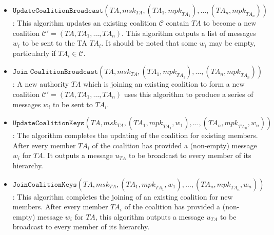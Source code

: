 \documentclass{llncs}
\newcommand{\TA}{\mathit{TA}}
\newcommand{\mpk}{\mathit{mpk}}
\newcommand{\msk}{\mathit{msk}}
\begin{document}
\begin{itemize}
%

\item $\texttt{UpdateCoalitionBroadcast}(\TA,\msk_{\TA},(\TA_{1},\mpk_{\TA_{1}}),\ldots,
(\TA_{n},\mpk_{\TA_{n}}))$: This algorithm updates an existing
coalition $\mathcal{C}$ contain $\TA$ to become a new coalition
$\mathcal{C}'=(\TA,\TA_{1},\ldots,\TA_{n})$. This algorithm outputs
a list of messages $w_{i}$ to be sent to the TA $\TA_{i}$. It should
be noted that some $w_{i}$ may be empty, particularly if $\TA_{i}\in
\mathcal{C}$.\medskip

\item $\texttt{Join CoalitionBroadcast}(\TA,\msk_{\TA},(\TA_{1},\mpk_{\TA_{1}}),\ldots,
(\TA_{n},\mpk_{\TA_{n}}))$: A new authority $\TA$ which is joining
an existing coalition to form a new coalition
$\mathcal{C}'=(\TA,\TA_{1},\ldots,\TA_{n})$ uses this algorithm to
produce a series of messages $w_{i}$ to be sent to
$\TA_{i}$.\medskip

\item $\texttt{UpdateCoalitionKeys}(\TA,\msk_{\TA},(\TA_{1},\mpk_{\TA_{1}},w_{1}),\ldots,
(\TA_{n},\mpk_{\TA_{n}},w_{n}))$: The algorithm completes the
updating of the coalition for existing members. After every member
$\TA_{i}$ of the coalition has provided a (non-empty) message
$w_{i}$ for $\TA$. It outputs a message $u_{\TA}$ to be broadcast to
every member of its hierarchy.\medskip

\item $\texttt{JoinCoalitionKeys}(\TA,\msk_{\TA},(\TA_{1},\mpk_{\TA_{1}},w_{1}),\ldots,
(\TA_{n},\mpk_{\TA_{n}},w_{n}))$: This algorithm completes the
joining of an existing coalition for new members. After every member
$\TA_{i}$ of the coalition has provided a (non-empty) message
$w_{i}$ for $\TA$, this algorithm outputs a message $u_{\TA}$ to be
broadcast to every member of its hierarchy.
\end{itemize}
\end{document}
